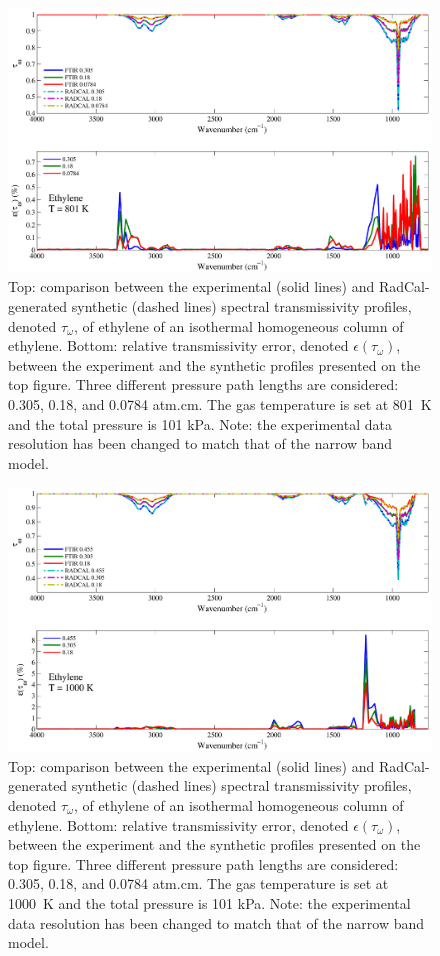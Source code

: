 \begin{figure}[p]
\includegraphics[width=\textwidth]{../Verification/Results_Test2/Ethylene_801.pdf}
\caption{Top: comparison between the experimental (solid lines) and RadCal-generated synthetic (dashed lines) spectral transmissivity profiles, denoted $\tau_{\omega}$, of ethylene of an isothermal homogeneous column of ethylene. Bottom: relative transmissivity error, denoted $\epsilon{(\tau_{\omega})}$, between the experiment and the synthetic profiles presented on the top figure. Three different pressure path lengths are considered: 0.305, 0.18, and 0.0784 atm.cm. The gas temperature is set at 801~K and the total pressure is 101 kPa. Note: the experimental data resolution has been changed to match that of the narrow band model. \label{fig:ethylene_Verify_801K}}
\end{figure}

\begin{figure}[p]
\includegraphics[width=\textwidth]{../Verification/Results_Test2/Ethylene_1000.pdf}
\caption{Top: comparison between the experimental (solid lines) and RadCal-generated synthetic (dashed lines) spectral transmissivity profiles, denoted $\tau_{\omega}$, of ethylene of an isothermal homogeneous column of ethylene. Bottom: relative transmissivity error, denoted $\epsilon{(\tau_{\omega})}$, between the experiment and the synthetic profiles presented on the top figure. Three different pressure path lengths are considered: 0.305, 0.18, and 0.0784 atm.cm. The gas temperature is set at 1000~K and the total pressure is 101 kPa. Note: the experimental data resolution has been changed to match that of the narrow band model. \label{fig:ethylene_Verify_1000K}}
\end{figure}


